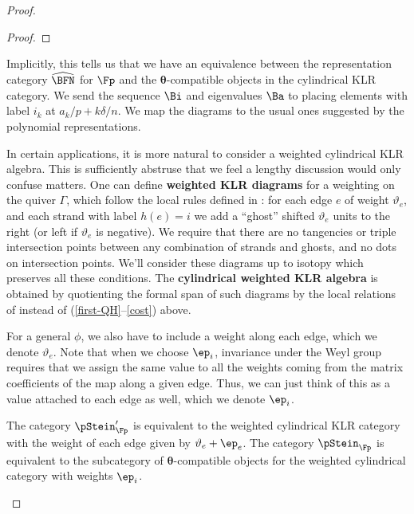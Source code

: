 \begin{proof}
\begin{proof}
\end{proof}
Implicitly, this tells us that we have an equivalence between the
representation category $\widehat{\BFN}$ for $\Fp$ and the
$\boldsymbol{\theta}$-compatible objects in the cylindrical KLR
category.  We send the sequence $\Bi$ and eigenvalues $\Ba$ to placing
elements with label $i_k$ at $a_k/p+k\delta/n$.  We map the diagrams
to the usual ones suggested by the polynomial representations.




In certain applications, it is more natural to consider a weighted
cylindrical KLR algebra.  This is sufficiently abstruse that we feel a
lengthy discussion would only confuse matters.  One can define {\bf
  weighted KLR diagrams} for a weighting on the quiver $\Gamma$, which
follow the local rules defined in \cite{WebwKLR}: for each edge $e$ of
weight $\vartheta_e$, and each strand with label $h(e)=i$ we add a
``ghost'' shifted $\vartheta_e$ units to the right (or left if
$\vartheta_e$ is negative).  We require that there are no tangencies or triple
intersection points between any combination of strands and ghosts, and
no dots on intersection points. 
We'll consider these diagrams up to isotopy which preserves all these
conditions.  The {\bf cylindrical weighted KLR algebra} is obtained by
quotienting the formal span of such diagrams by the local relations of
\cite[Def. 2.4]{WebwKLR} instead of (\ref{first-QH}--\ref{cost})
above. 

For a general $\phi$, we also have to include a weight along each
edge, which we denote $\vartheta_e$.  Note that when we choose $\ep_i$, invariance under the Weyl group
requires that we assign the same value to all the weights coming from
the matrix coefficients of the map along a given edge.  Thus, we can
just think of this as a value attached to each edge as well, which we
denote $\ep_i$.  
\begin{lemma}\label{lem:weighted-pStein}
The category $\pStein_\Fp'$ is equivalent to the weighted cylindrical
KLR category with the weight of each edge given by $\vartheta_e+\ep_e$.  The category $\pStein_\Fp$ is equivalent to the subcategory of $\boldsymbol{\theta}$-compatible objects for the weighted cylindrical category with weights $\ep_i$.  
\end{lemma}





\end{proof}
